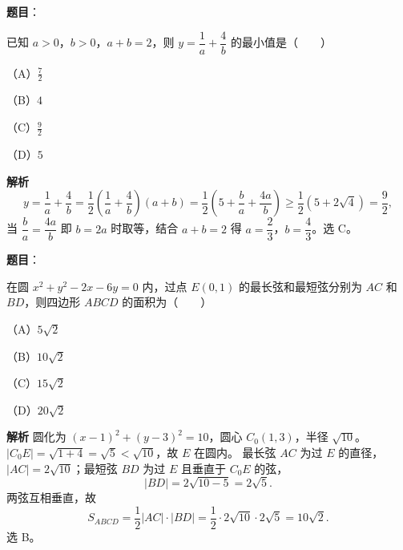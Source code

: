 \begin{answer}

\textbf{题目}：

已知 $a>0$，$b>0$，$a+b=2$，则 $y=\dfrac1a+\dfrac4b$ 的最小值是\mbox{（　　）}

（A）$\frac72$

（B）$4$

（C）$\frac92$

（D）$5$

\textbf{解析}
\nopagebreak[4]
\[y=\frac1a+\frac4b=\frac12\left(\frac1a+\frac4b\right)(a+b)=\frac12\left(5+\frac ba+\frac{4a}b\right)\geqslant\frac12\left(5+2\sqrt4\right)=\frac92,\]
当 $\dfrac ba=\dfrac{4a}b$ 即 $b=2a$ 时取等，结合 $a+b=2$ 得 $a=\dfrac23$，$b=\dfrac43$。选 C。


\end{answer}
\begin{answer}

\textbf{题目}：

在圆 $x^2+y^2-2x-6y=0$ 内，过点 $E(0,1)$ 的最长弦和最短弦分别为 $AC$ 和 $BD$，则四边形 $ABCD$ 的面积为\mbox{（　　）}

（A）$5\sqrt2$

（B）$10\sqrt2$

（C）$15\sqrt2$

（D）$20\sqrt2$

\textbf{解析}
圆化为 $(x-1)^2+(y-3)^2=10$，圆心 $C_0(1,3)$，半径 $\sqrt{10}$。$|C_0E|=\sqrt{1+4}=\sqrt5<\sqrt{10}$，故 $E$ 在圆内。
最长弦 $AC$ 为过 $E$ 的直径，$|AC|=2\sqrt{10}$；最短弦 $BD$ 为过 $E$ 且垂直于 $C_0E$ 的弦，
\nopagebreak[4]
\[|BD|=2\sqrt{10-5}=2\sqrt5.\]
两弦互相垂直，故
\nopagebreak[4]
\[S_{ABCD}=\frac12|AC|\cdot|BD|=\frac12\cdot2\sqrt{10}\cdot2\sqrt5=10\sqrt2.\]
选 B。


\end{answer}
